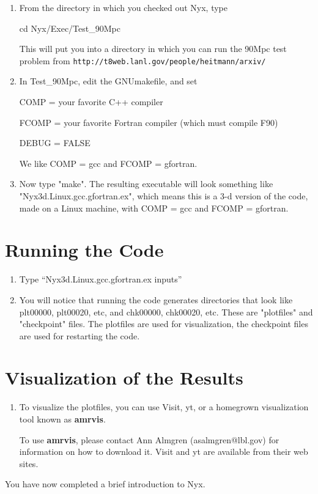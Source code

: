 \begin{enumerate}

\item From the directory in which you checked out Nyx, type

cd Nyx/Exec/Test\_90Mpc

This will put you into a directory in which you can run the 90Mpc test problem from 
{\tt http://t8web.lanl.gov/people/heitmann/arxiv/}

\item In Test\_90Mpc, edit the GNUmakefile, and set

COMP = your favorite C++ compiler

FCOMP = your favorite Fortran compiler (which must compile F90)

DEBUG = FALSE

We like COMP = gcc and FCOMP = gfortran. 

\item Now type "make". The resulting executable will look something like 
"Nyx3d.Linux.gcc.gfortran.ex", which means this is a 3-d version of the code, 
made on a Linux machine, with COMP = gcc and FCOMP = gfortran.

\end{enumerate}

\section{Running the Code}

\begin{enumerate}

\item Type ``Nyx3d.Linux.gcc.gfortran.ex inputs''

\item You will notice that running the code generates directories that look like 
plt00000, plt00020, etc, and chk00000, chk00020, etc. These are "plotfiles" and 
"checkpoint" files. The plotfiles are used for visualization, the checkpoint files are 
used for restarting the code.

\end{enumerate}

\section{Visualization of the Results}

\begin{enumerate}

\item To visualize the plotfiles, you can use Visit, yt, or 
a homegrown visualization tool known as {\bf amrvis}.

To use {\bf amrvis}, please contact Ann Almgren (asalmgren@lbl.gov) for information on how
to download it.  Visit and yt are available from their web sites.

\end{enumerate}

You have now completed a brief introduction to Nyx. 
